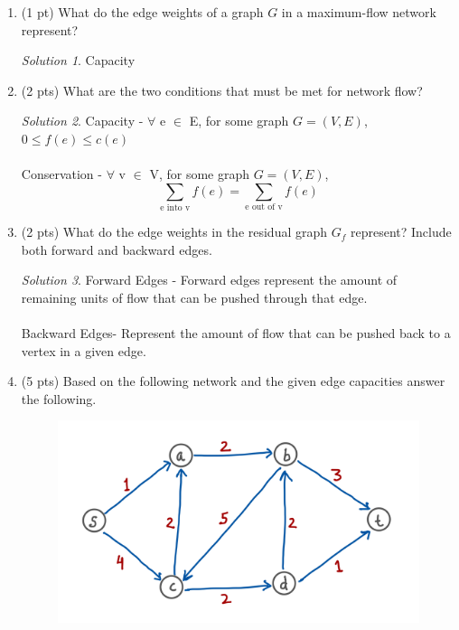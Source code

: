 \documentclass[12pt]{article}
\theoremstyle{remark}
\newtheorem*{solution}{Solution}
\begin{document}
\hrulefill

\newpage
\begin{enumerate}
\item (1 pt) What do the edge weights of a graph $G$ in a maximum-flow network represent?

\begin{solution}
Capacity
\end{solution}

\item (2 pts) What are the two conditions that must be met for network flow?
\begin{solution}
Capacity - $\forall$ e $\in$ E, for some graph $G=(V,E)$, $0\leq f(e) \leq c(e)$ \\ \\ 
Conservation - $\forall$ v $\in$ V, for some graph $G=(V,E)$, $$\sum_{\text{e into v}} f(e) = \sum_{\text{e out of v}} f(e)$$
\end{solution}


\item (2 pts) What do the edge weights in the residual graph $G_f$ represent? Include both forward and backward edges.
\begin{solution}
Forward Edges - Forward edges represent the amount of remaining units of flow that can be pushed through that edge.\\ \\
Backward Edges- Represent the amount of flow that can be pushed back to a vertex in a given edge.
\end{solution}

\pagebreak
\item (5 pts) Based on the following network and the given edge capacities answer the following. 
\begin{figure}[h!]
\begin{center}
\includegraphics[scale=0.3]{Flow_6a.jpeg}
\end{center}
\end{figure}


\end{enumerate}
\end{document}
